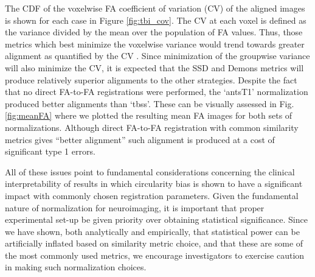 \documentclass[final,5p,times,twocolumn]{elsarticle}
\begin{document}




The CDF of the voxelwise FA coefficient of variation (CV) of the aligned
images is shown for each case in Figure \ref{fig:tbi_cov}.  
The CV at each voxel is defined as the variance
divided by the mean over the population of FA values.  Thus,
those metrics which best minimize the voxelwise variance would
trend towards greater alignment as quantified by the CV \cite{van-hecke2011}.
Since minimization of the groupwise variance
will also minimize the CV, it is expected that the SSD and Demons 
metrics will produce relatively superior alignments to the
other strategies.  Despite the fact that no direct FA-to-FA 
registrations were performed, the `antsT1' normalization produced better alignments
than `tbss'.  These can be visually assessed in Fig. \ref{fig:meanFA} where
we plotted the resulting mean FA images for both sets of normalizations.
Although direct FA-to-FA registration with common
similarity metrics gives ``better alignment'' such alignment is 
produced at a cost of significant type 1 errors.  

All of these issues point to fundamental considerations concerning the
clinical interpretability of results in which circularity bias is shown 
to have a significant impact with commonly chosen registration 
parameters.  Given the fundamental nature of normalization for
neuroimaging, it is important that proper experimental set-up be
given priority over obtaining statistical significance.  Since
we have shown, both analytically and empirically,  that statistical 
power can be artificially inflated based on similarity metric choice,
and that these are some of the most commonly used metrics, we encourage
investigators to exercise caution in making such normalization choices.
\end{document}
